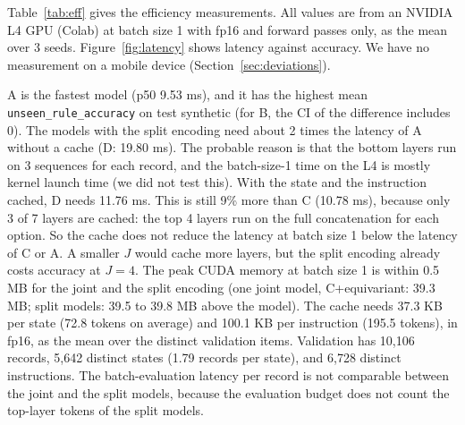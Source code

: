 \documentclass[11pt,a4paper]{article}
\newcommand{\ura}{\texttt{unseen\_\allowbreak rule\_\allowbreak accuracy}}
\begin{document}
Table~\ref{tab:eff} gives the efficiency measurements.
All values are from an NVIDIA L4 GPU (Colab) at batch size 1 with fp16 and forward passes only, as the mean over 3 seeds.
Figure~\ref{fig:latency} shows latency against accuracy.
We have no measurement on a mobile device (Section~\ref{sec:deviations}).

A is the fastest model (p50 9.53 ms), and it has the highest mean \ura{} on test synthetic (for B, the CI of the difference includes 0).
The models with the split encoding need about 2 times the latency of A without a cache (D: 19.80 ms).
The probable reason is that the bottom layers run on 3 sequences for each record, and the batch-size-1 time on the L4 is mostly kernel launch time (we did not test this).
With the state and the instruction cached, D needs 11.76 ms.
This is still 9\% more than C (10.78 ms), because only 3 of 7 layers are cached: the top 4 layers run on the full concatenation for each option.
So the cache does not reduce the latency at batch size 1 below the latency of C or A.
A smaller $J$ would cache more layers, but the split encoding already costs accuracy at $J = 4$.
The peak CUDA memory at batch size 1 is within 0.5 MB for the joint and the split encoding (one joint model, C+equivariant: 39.3 MB; split models: 39.5 to 39.8 MB above the model).
The cache needs 37.3 KB per state (72.8 tokens on average) and 100.1 KB per instruction (195.5 tokens), in fp16, as the mean over the distinct validation items.
Validation has 10{,}106 records, 5{,}642 distinct states (1.79 records per state), and 6{,}728 distinct instructions.
The batch-evaluation latency per record is not comparable between the joint and the split models, because the evaluation budget does not count the top-layer tokens of the split models.
\end{document}
